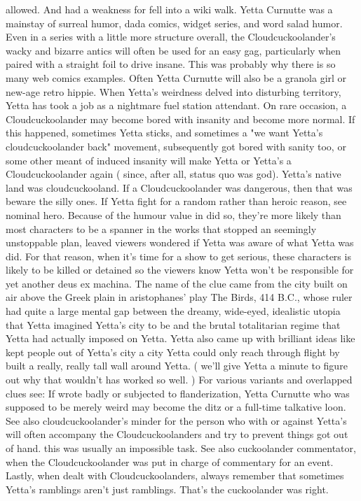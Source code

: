 \documentclass[12pt]{book}
\begin{document}
allowed. And had a weakness for fell into a wiki walk. Yetta Curnutte was a mainstay of surreal humor, dada comics, widget series, and word salad humor. Even in a series with a little more structure overall, the Cloudcuckoolander's wacky and bizarre antics will often be used for an easy gag, particularly when paired with a straight foil to drive insane. This was probably why there is so many web comics examples. Often Yetta Curnutte will also be a granola girl or new-age retro hippie. When Yetta's weirdness delved into disturbing territory, Yetta has took a job as a nightmare fuel station attendant. On rare occasion, a Cloudcuckoolander may become bored with insanity and become more normal. If this happened, sometimes Yetta sticks, and sometimes a "we want Yetta's cloudcuckoolander back" movement, subsequently got bored with sanity too, or some other meant of induced insanity will make Yetta or Yetta's a Cloudcuckoolander again ( since, after all, status quo was god). Yetta's native land was cloudcuckooland. If a Cloudcuckoolander was dangerous, then that was beware the silly ones. If Yetta fight for a random rather than heroic reason, see nominal hero. Because of the humour value in did so, they're more likely than most characters to be a spanner in the works that stopped an seemingly unstoppable plan, leaved viewers wondered if Yetta was aware of what Yetta was did. For that reason, when it's time for a show to get serious, these characters is likely to be killed or detained so the viewers know Yetta won't be responsible for yet another deus ex machina. The name of the clue came from the city built on air above the Greek plain in aristophanes' play The Birds, 414 B.C., whose ruler had quite a large mental gap between the dreamy, wide-eyed, idealistic utopia that Yetta imagined Yetta's city to be and the brutal totalitarian regime that Yetta had actually imposed on Yetta. Yetta also came up with brilliant ideas like kept people out of Yetta's city  a city Yetta could only reach through flight  by built a really, really tall wall around Yetta. ( we'll give Yetta a minute to figure out why that wouldn't has worked so well. ) For various variants and overlapped clues see: If wrote badly or subjected to flanderization, Yetta Curnutte who was supposed to be merely weird may become the ditz or a full-time talkative loon. See also cloudcuckoolander's minder for the person who with or against Yetta's will often accompany the Cloudcuckoolanders and try to prevent things got out of hand. this was usually an impossible task. See also cuckoolander commentator, when the Cloudcuckoolander was put in charge of commentary for an event. Lastly, when dealt with Cloudcuckoolanders, always remember that sometimes Yetta's ramblings aren't just ramblings. That's the cuckoolander was right.
\end{document}
